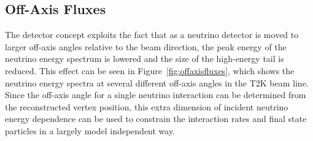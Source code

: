 \subsection{Off-Axis Fluxes}

The \nuprism detector concept exploits the fact that as a neutrino detector is moved to larger off-axis angles relative to the beam direction, the peak energy of the neutrino energy spectrum is lowered and the size of the high-energy tail is reduced. This effect can be seen in Figure~\ref{fig:offaxisfluxes}, which shows the neutrino energy spectra at several different off-axis angles in the T2K beam line.  Since the off-axis angle for a single neutrino interaction can be determined from the reconstructed vertex position, this extra dimension of incident neutrino energy dependence can be used to constrain the interaction rates and final state particles in a largely model independent way.

